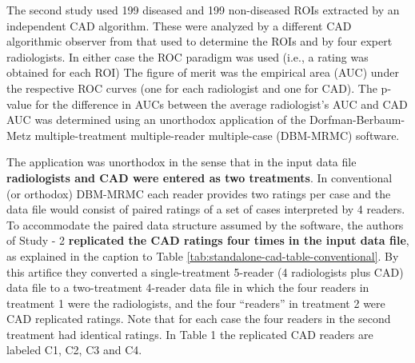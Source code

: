 \documentclass[
]{book}
\begin{document}
The second study \citep{kooi2016comparison} used 199 diseased and 199 non-diseased ROIs extracted by an independent CAD algorithm. These were analyzed by a different CAD algorithmic observer from that used to determine the ROIs and by four expert radiologists. In either case the ROC paradigm was used (i.e., a rating was obtained for each ROI) The figure of merit was the empirical area (AUC) under the respective ROC curves (one for each radiologist and one for CAD). The p-value for the difference in AUCs between the average radiologist's AUC and CAD AUC was determined using an unorthodox application of the Dorfman-Berbaum-Metz \citep{dorfman1992receiver} multiple-treatment multiple-reader multiple-case (DBM-MRMC) software.

The application was unorthodox in the sense that in the input data file \textbf{radiologists and CAD were entered as two treatments}. In conventional (or orthodox) DBM-MRMC each reader provides two ratings per case and the data file would consist of paired ratings of a set of cases interpreted by 4 readers. To accommodate the paired data structure assumed by the software, the authors of Study - 2 \textbf{replicated the CAD ratings four times in the input data file}, as explained in the caption to Table \ref{tab:standalone-cad-table-conventional}. By this artifice they converted a single-treatment 5-reader (4 radiologists plus CAD) data file to a two-treatment 4-reader data file in which the four readers in treatment 1 were the radiologists, and the four ``readers'' in treatment 2 were CAD replicated ratings. Note that for each case the four readers in the second treatment had identical ratings. In Table 1 the replicated CAD readers are labeled C1, C2, C3 and C4.
\end{document}
